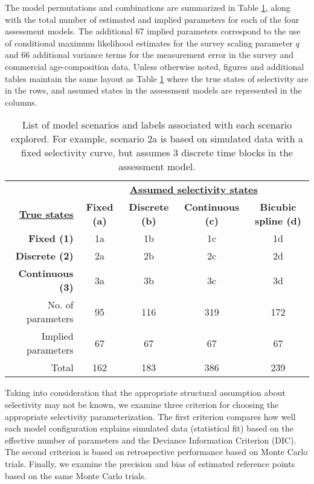 The model permutations and combinations are summarized in Table \ref{tab:scenarios}, along with the total number of estimated and implied parameters for each of the four assessment models.  The additional 67 implied parameters correspond to the use of conditional maximum likelihood estimates for the survey scaling parameter $q$ and 66 additional variance terms for the measurement error in the survey and commercial age-composition data.  Unless otherwise noted, figures and additional tables maintain the same layout as Table \ref{tab:scenarios} where the true states of selectivity are in the rows, and assumed states in the assessment models are represented in the columns.

\begin{table}[!tbh]
	\caption{List of model scenarios and labels associated with each scenario explored.  For example, scenario 2a is based on simulated data with a fixed selectivity curve, but assumes 3 discrete time blocks in the assessment model.}
	\label{tab:scenarios}
	\begin{center}
		\begin{tabular}{r|cccc}
		\hline

		\hline
		
		&\multicolumn{4}{c}{\textbf{\underline{Assumed selectivity states}}}\\
		\textbf{\textbf{\underline{True states}}}
		&\textbf{Fixed (a)} & \textbf{Discrete (b)} & \textbf{Continuous (c)} & \textbf{Bicubic spline (d)} \\
		\hline
		 \textbf{Fixed (1)}      & 1a & 1b & 1c & 1d\\
		 \textbf{Discrete (2)}   & 2a & 2b & 2c & 2d\\
		 \textbf{Continuous (3)} & 3a & 3b & 3c & 3d\\
		\hline

		\hline
		No. of parameters & 95 & 116 & 319 & 172\\
		Implied parameters & 67 &67 &67 & 67 \\
		\hline
		Total  & 162 & 183 &  386 & 239 \\
		\hline

		\hline
		\end{tabular}
	\end{center}
\end{table}

Taking into consideration that the appropriate structural assumption about selectivity may not be known, we examine three criterion for choosing the appropriate selectivity parameterization.  The first criterion compares how well each model configuration explains simulated data (statistical fit) based on the effective number of parameters and the  Deviance Information Criterion (DIC).  The second criterion is based on retrospective performance based on Monte Carlo trials. Finally, we examine the precision and bias of estimated reference points based on the same Monte Carlo trials.

